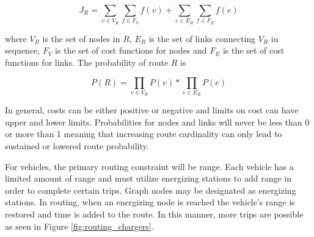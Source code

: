 \documentclass[12pt]{article}
\begin{document}
\begin{equation}
	J_R = \sum_{v\in V_R}\sum_{f\in F_V} f(v) + \sum_{e\in E_R}\sum_{f\in F_E} f(e)
\end{equation}

where $V_R$ is the set of nodes in $R$, $E_R$ is the set of links connecting $V_R$ in sequence, $F_V$ is the set of cost functions for nodes and $F_E$ is the set of cost functions for links. The probability of route $R$ is

\begin{equation}
	P(R) = \prod_{v\in V_R}P(v) * \prod_{e\in E_R}P(e)
\end{equation}

In general, costs can be either positive or negative and limits on cost can have upper and lower limits. Probabilities for nodes and links will never be less than 0 or more than 1 meaning that increasing route cardinality can only lead to sustained or lowered route probability.

For vehicles, the primary routing constraint will be range. Each vehicle has a limited amount of range and must utilize energizing stations to add range in order to complete certain trips. Graph nodes may be designated as energizing stations. In routing, when an energizing node is reached the vehicle's range is restored and time is added to the route. In this manner, more trips are possible as seen in Figure \ref{fig:routing_chargers}.
\end{document}
